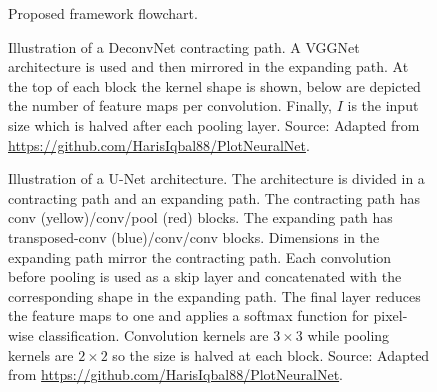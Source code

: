 \begin{figure}
    \centering
    \caption[Proposed framework flowchart]{Proposed framework flowchart.}
    \label{fig:flowchart}
\end{figure}

\begin{figure}
    \centering
    \resizebox{\linewidth}{!}{
    
    }
    \caption[Illustration of a DeconvNet contracting path]{Illustration of a DeconvNet contracting path. A VGGNet architecture is used and then mirrored in the expanding path. At the top of each block the kernel shape is shown, below are depicted the number of feature maps per convolution. Finally, $I$ is the input size which is halved after each pooling layer. Source: Adapted from \url{https://github.com/HarisIqbal88/PlotNeuralNet}.}
    \label{fig:deconv}
\end{figure}

\begin{figure}
    \centering
    \resizebox{\linewidth}{!}{
    
    }
    \caption[Illustration of a U-Net architecture]{Illustration of a U-Net architecture. The architecture is divided in a contracting path and an expanding path. The contracting path has conv (yellow)/conv/pool (red) blocks. The expanding path has transposed-conv (blue)/conv/conv blocks. Dimensions in the expanding path mirror the contracting path. Each convolution before pooling is used as a skip layer and concatenated with the corresponding shape in the expanding path. The final layer reduces the feature maps to one and applies a softmax function for pixel-wise classification. Convolution kernels are $3\times 3$ while pooling kernels are $2\times 2$ so the size is halved at each block. Source: Adapted from \url{https://github.com/HarisIqbal88/PlotNeuralNet}.}
    \label{fig:unet}
\end{figure}

